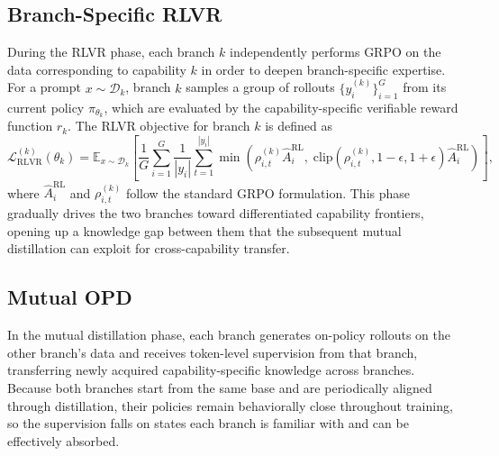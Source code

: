 \documentclass{llmxive}
\begin{document}
\subsection{Branch-Specific RLVR}
\label{sec:rlvr}
During the RLVR phase, each branch $k$ independently performs GRPO on the data corresponding to capability $k$ in order to deepen branch-specific expertise. For a prompt $x \sim \mathcal{D}_k$, branch $k$ samples a group of rollouts $\{y_i^{(k)}\}_{i=1}^{G}$ from its current policy $\pi_{\theta_k}$, which are evaluated by the capability-specific verifiable reward function $r_k$. The RLVR objective for branch $k$ is defined as
\begin{equation}
\label{eq:rlvr}
\mathcal{L}_{\mathrm{RLVR}}^{(k)}(\theta_k)
=
\mathbb{E}_{x \sim \mathcal{D}_k}
\left[
\frac{1}{G}\sum_{i=1}^{G}\frac{1}{|y_i|}
\sum_{t=1}^{|y_i|}
\min\!\left(
\rho_{i,t}^{(k)} \hat{A}_i^{\mathrm{RL}},
\;
\mathrm{clip}\!\left(\rho_{i,t}^{(k)}, 1-\epsilon, 1+\epsilon\right)\hat{A}_i^{\mathrm{RL}}
\right)
\right],
\end{equation}
where $\hat{A}_i^{\mathrm{RL}}$ and $\rho_{i,t}^{(k)}$ follow the standard GRPO formulation. 
This phase gradually drives the two branches toward differentiated capability frontiers, opening up a knowledge gap between them that the subsequent mutual distillation can exploit for cross-capability transfer.

\subsection{Mutual OPD}
\label{sec:opd}
In the mutual distillation phase, each branch generates on-policy rollouts on the other branch's data and receives token-level supervision from that branch, transferring newly acquired capability-specific knowledge across branches. Because both branches start from the same base and are periodically aligned through distillation, their policies remain behaviorally close throughout training, so the supervision falls on states each branch is familiar with and can be effectively absorbed.
\end{document}
